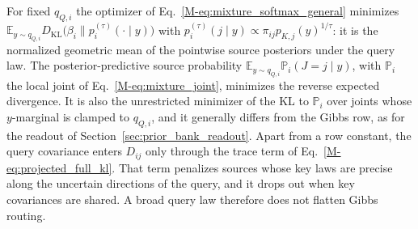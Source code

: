 \documentclass[twoside,11pt]{article}
\begin{document}
For fixed $q_{Q,i}$ the optimizer of Eq.~\eqref{M-eq:mixture_softmax_general} minimizes $\mathbb E_{y\sim q_{Q,i}}D_{\mathrm{KL}}\bigl(\beta_i\|p_i^{(\tau)}(\cdot\mid y)\bigr)$ with $p_i^{(\tau)}(j\mid y)\propto\pi_{ij}p_{K,j}(y)^{1/\tau}$: it is the normalized geometric mean of the pointwise source posteriors under the query law. The posterior-predictive source probability $\mathbb E_{y\sim q_{Q,i}}\mathbb P_i(J=j\mid y)$, with $\mathbb P_i$ the local joint of Eq.~\eqref{M-eq:mixture_joint}, minimizes the reverse expected divergence. It is also the unrestricted minimizer of the KL to $\mathbb P_i$ over joints whose $y$-marginal is clamped to $q_{Q,i}$, and it generally differs from the Gibbs row, as for the readout of Section~\ref{sec:prior_bank_readout}. Apart from a row constant, the query covariance enters $D_{ij}$ only through the trace term of Eq.~\eqref{M-eq:projected_full_kl}. That term penalizes sources whose key laws are precise along the uncertain directions of the query, and it drops out when key covariances are shared. A broad query law therefore does not flatten Gibbs routing.
\end{document}
